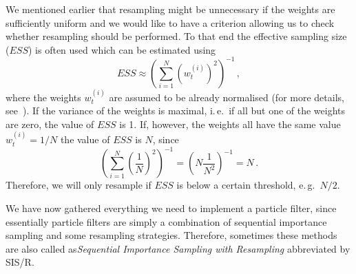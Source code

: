 We mentioned earlier that resampling might be unnecessary if the
weights are sufficiently uniform and we would like to have a criterion
allowing us to check whether resampling should be performed. To that
end the effective sampling size ($ESS$) is often used which can be
estimated using
\begin{equation}
  \label{eq:ESS}
  ESS \approx {\left( \sum_{i=1}^N {\left( w_t^{(i)} \right)}^2
    \right)}^{-1} \,,
\end{equation}
where the weights $w_t^{(i)}$ are assumed to be already normalised
(for more details, see~\cite[179]{arulampalam}). If the variance of
the weights is maximal, i.\,e.\ if all but one of the weights are
zero, the value of $ESS$ is 1. If, however, the weights all have the
same value $w_t^{(i)} = 1/N$ the value of $ESS$ is $N$, since
\[
  {\left( \sum_{i=1}^N {\left( \frac{1}{N} \right)}^2 \right)}^{-1} =
  {\left( N \frac{1}{N^2} \right)}^{-1} = N \,.
\]
Therefore, we will only resample if $ESS$ is below a certain
threshold, e.\,g.\ $N/2$.

We have now gathered everything we need to implement a particle
filter, since essentially particle filters are simply a combination of
sequential importance sampling and some resampling
strategies. Therefore, sometimes these methods are also called
as\emph{Sequential Importance Sampling with Resampling} abbreviated by
SIS/R.
